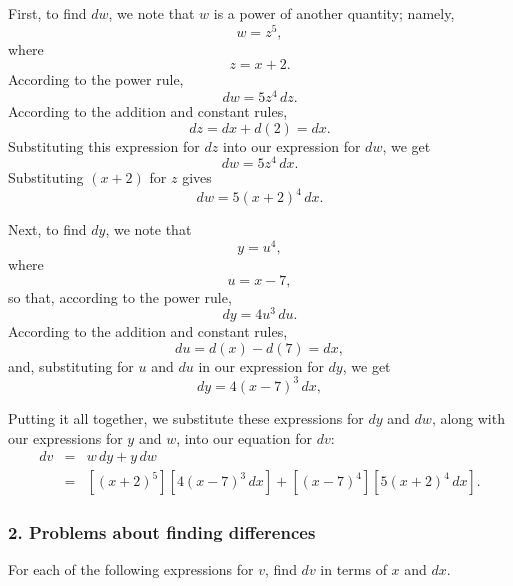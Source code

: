 \documentclass[twoside,openright]{article}
\begin{document}
\begin{enumerate}
First, to find $dw$, we note that $w$ is a power of another quantity; namely,
$$w = z^5,$$
where 
$$z = x+2.$$
According to the power rule,
$$dw = 5z^4\,dz.$$
According to the addition and constant rules,
$$dz = dx + d(2) = dx.$$
Substituting this expression for $dz$ into our expression for $dw$, we get
$$dw = 5z^4\,dx.$$
Substituting $(x+2)$ for $z$ gives
$$dw = 5(x+2)^4\,dx.$$

Next, to find $dy$, we note that 
$$y = u^4,$$
where 
$$u = x -7,$$
so that, according to the power rule,
$$dy = 4u^3\,du.$$
According to the addition and constant rules, 
$$du = d(x) - d(7) = dx,$$
and, substituting for $u$ and $du$ in our expression for $dy$, we get
$$dy = 4(x-7)^3\,dx,$$

Putting it all together, we substitute these expressions for $dy$ and
$dw$, along with our expressions for $y$ and $w$, into our equation
for $dv$:
\begin{eqnarray*}
dv & = & w\,dy + y\,dw \\
& = & \left[(x+2)^5\right]\left[4(x-7)^3\,dx\right] + \left[(x-7)^4\right]\left[5(x+2)^4\,dx\right] .
\end{eqnarray*}
 
 
\end{enumerate}


\subsubsection*{2. Problems about finding differences}
For each of the following expressions for $v$, find $dv$ in terms of $x$ and $dx$.\label{pset1}
\end{document}
